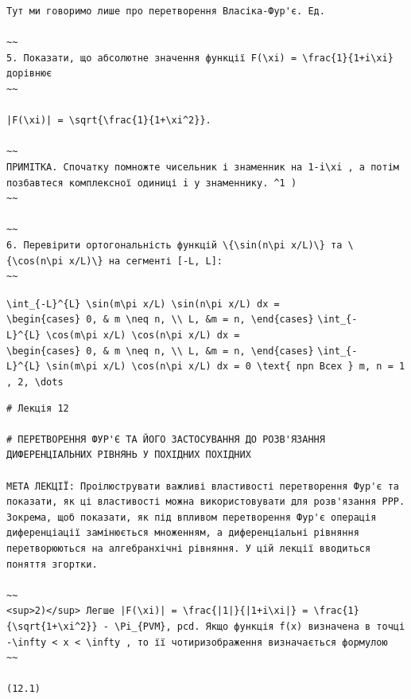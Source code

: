 \documentclass[
  ukrainian,
]{article}
\begin{document}
\begin{verbatim}
Тут ми говоримо лише про перетворення Власіка-Фур'є. Ед.

~~
5. Показати, що абсолютне значення функції F(\xi) = \frac{1}{1+i\xi} дорівнює
~~

|F(\xi)| = \sqrt{\frac{1}{1+\xi^2}}.

~~
ПРИМІТКА. Спочатку помножте чисельник і знаменник на 1-i\xi , а потім позбавтеся комплексної одиниці i у знаменнику. ^1 )
~~

~~
6. Перевірити ортогональність функцій \{\sin(n\pi x/L)\} та \{\cos(n\pi x/L)\} на сегменті [-L, L]:
~~
\end{verbatim}

\texttt{\textbackslash{}int\_\{-L\}\^{}\{L\}\ \textbackslash{}sin(m\textbackslash{}pi\ x/L)\ \textbackslash{}sin(n\textbackslash{}pi\ x/L)\ dx\ =}
\texttt{\textbackslash{}begin\{cases\}\ 0,\ \&\ m\ \textbackslash{}neq\ n,\ \textbackslash{}\textbackslash{}\ L,\ \&m\ =\ n,\ \textbackslash{}end\{cases\}}
\texttt{\textbackslash{}int\_\{-L\}\^{}\{L\}\ \textbackslash{}cos(m\textbackslash{}pi\ x/L)\ \textbackslash{}cos(n\textbackslash{}pi\ x/L)\ dx\ =}
\texttt{\textbackslash{}begin\{cases\}\ 0,\ \&\ m\ \textbackslash{}neq\ n,\ \textbackslash{}\textbackslash{}\ L,\ \&m\ =\ n,\ \textbackslash{}end\{cases\}}
\texttt{\textbackslash{}int\_\{-L\}\^{}\{L\}\ \textbackslash{}sin(m\textbackslash{}pi\ x/L)\ \textbackslash{}cos(n\textbackslash{}pi\ x/L)\ dx\ =\ 0\ \textbackslash{}text\{\ npn\ Bcex\ \}\ m,\ n\ =\ 1,\ 2,\ \textbackslash{}dots}

\begin{verbatim}
# Лекція 12

# ПЕРЕТВОРЕННЯ ФУР'Є ТА ЙОГО ЗАСТОСУВАННЯ ДО РОЗВ'ЯЗАННЯ ДИФЕРЕНЦІАЛЬНИХ РІВНЯНЬ У ПОХІДНИХ ПОХІДНИХ

МЕТА ЛЕКЦІЇ: Проілюструвати важливі властивості перетворення Фур'є та показати, як ці властивості можна використовувати для розв'язання PPP. Зокрема, щоб показати, як під впливом перетворення Фур'є операція диференціації замінюється множенням, а диференціальні рівняння перетворюються на алгебранхічні рівняння. У цій лекції вводиться поняття згортки.

~~
<sup>2)</sup> Легше |F(\xi)| = \frac{|1|}{|1+i\xi|} = \frac{1}{\sqrt{1+\xi^2}} - \Pi_{PVM}, pcd. Якщо функція f(x) визначена в точці -\infty < x < \infty , то її чотиризображення визначається формулою
~~

(12.1)
\end{verbatim}
\end{document}
